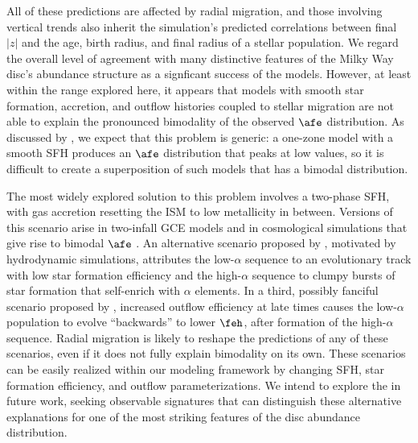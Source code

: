 All of these predictions are affected by radial migration, and those involving
vertical trends also inherit the simulation's predicted correlations between
final $|z|$ and the age, birth radius, and final radius of a stellar population.
We regard the overall level of agreement with many distinctive features of the
Milky Way disc's abundance structure as a signficant success of the models.
However, at least within the range explored here, it appears that models
with smooth star formation, accretion, and outflow histories coupled to
stellar migration are not able to explain the pronounced bimodality of 
the observed $\afe$ distribution.  As discussed by \cite{Vincenzo2021},
we expect that this problem is generic: a one-zone model with a smooth
SFH produces an $\afe$ distribution that peaks at low values, so it is
difficult to create a superposition of such models that has a bimodal 
distribution.

The most widely explored solution to this problem involves a two-phase SFH,
with gas accretion resetting the ISM to low metallicity in between.
Versions of this scenario arise in two-infall GCE models
\citep{Chiappini1997,Spintoni2018,Khoperskov2021} and in cosmological
simulations that give rise to bimodal $\afe$
\citep{Mackereth2017,Grand2018,Buck2020}.  
An alternative scenario proposed by \cite{Clarke2019}, motivated by
hydrodynamic simulations, attributes the low-$\alpha$ sequence to an
evolutionary track with low star formation efficiency and the high-$\alpha$
sequence to clumpy bursts of star formation that self-enrich with
$\alpha$ elements.  In a third, possibly fanciful scenario proposed by
\cite{Weinberg2017}, increased outflow efficiency at late times causes
the low-$\alpha$ population to evolve ``backwards'' to lower $\feh$, after
formation of the high-$\alpha$ sequence.  Radial migration is likely
to reshape the predictions of any of these scenarios, even if it does not
fully explain bimodality on its own.  These scenarios can be easily realized
within our modeling framework by changing SFH, star formation efficiency,
and outflow parameterizations.  We intend to explore the in future work,
seeking observable signatures that can distinguish these alternative 
explanations for one of the most striking features of the disc abundance
distribution.

